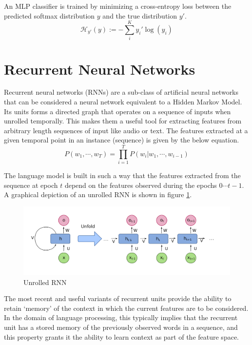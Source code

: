 An MLP classifier is trained by minimizing a cross-entropy loss between the predicted softmax distribution $y$ and the true distribution $y'$.
\begin{equation}
    \mathcal{H}_{y'} (y) := - \sum_{i}^K y_{i}' \log (y_i) 
\end{equation}

\section{Recurrent Neural Networks}

Recurrent neural networks (RNNs) are a sub-class of artificial neural networks that can be considered a neural network equivalent to a Hidden Markov Model. Its units forms a directed graph that operates on a sequence of inputs when unrolled temporally. This makes them a useful tool for extracting features from arbitrary length sequences of input like audio or text. The features extracted at a given temporal point in an instance (sequence) is given by the below equation.
\begin{equation}
	P(w_1, \cdots, w_T) = \prod_{i=1}^T P(w_i | w_1, \cdots, w_{i−1})
\end{equation}

The language model is built in such a way that the features extracted from the sequence at epoch $t$ depend on the features observed during the epochs $0 \cdots t-1$. A graphical depiction of an unrolled RNN is shown in figure \ref{fig:recurrent-neural-network-unfold}.

\begin{figure}[ht]
	\centering
	\includegraphics[width=\textwidth]{images/recurrent-neural-network-unfold}
	\caption{\label{fig:recurrent-neural-network-unfold} Unrolled RNN}
\end{figure}

The most recent and useful variants of recurrent units provide the ability to retain `memory' of the context in which the current features are to be considered. In the domain of language processing, this typically implies that the recurrent unit has a stored memory of the previously observed words in a sequence, and this property grants it the ability to learn context as part of the feature space.

